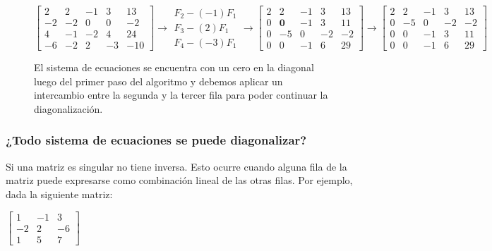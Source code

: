 \begin{figure}[H]
    $$
    \left[\begin{array}{cccc|c}
    2 & 2 & -1 & 3 & 13 \\
    -2 & -2 & 0 & 0 & -2 \\
    4 & -1 & -2 & 4 & 24 \\
    -6 & -2 & 2 & -3 & -10
    \end{array}\right] \rightarrow \begin{gathered}
    F_2-(-1) F_1 \\
    F_3-(2) F_1 \\
    F_4-(-3) F_1
    \end{gathered} \longrightarrow\left[\begin{array}{cccc|c}
    2 & 2 & -1 & 3 & 13 \\
    0 & \textbf{0} & -1 & 3 & 11 \\
    0 & -5 & 0 & -2 & -2 \\
    0 & 0 & -1 & 6 & 29
    \end{array}\right]\longrightarrow\left[\begin{array}{cccc|c}
    2 & 2 & -1 & 3 & 13 \\
    0 & -5 & 0 & -2 & -2 \\
    0 & 0 & -1 & 3 & 11 \\
    0 & 0 & -1 & 6 & 29
    \end{array}\right]
    $$
    
    \caption{El sistema de ecuaciones se encuentra con un cero en la diagonal luego del primer paso del algoritmo y debemos aplicar un intercambio entre la segunda y la tercer fila para poder continuar la diagonalización.}
    \label{fig:pivoting}

\end{figure}

\subsubsection{¿Todo sistema de ecuaciones se puede diagonalizar?}
\label{sec:sin_solucion}

Si una matriz es singular no tiene inversa. Esto ocurre cuando alguna fila de la matriz puede expresarse como combinación lineal de las otras filas. Por ejemplo, dada la siguiente matriz:

\begin{center}
$\begin{bmatrix}
1 & -1 & 3\\
-2 & 2 & -6\\
1 & 5 & 7
\end{bmatrix}$
\end{center}

